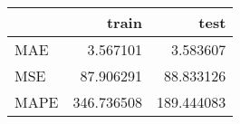 \begin{tabular}{lrr}
\toprule
{} &       train &        test \\
\midrule
MAE  &    3.567101 &    3.583607 \\
MSE  &   87.906291 &   88.833126 \\
MAPE &  346.736508 &  189.444083 \\
\bottomrule
\end{tabular}
